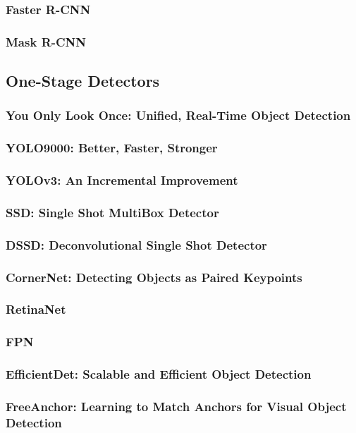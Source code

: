 \documentclass{article}
\begin{document}
\subsubsection{Faster R-CNN}
\subsubsection{Mask R-CNN}

\subsection{One-Stage Detectors}
\subsubsection{You Only Look Once: Unified, Real-Time Object Detection}
\subsubsection{YOLO9000: Better, Faster, Stronger}
\subsubsection{YOLOv3: An Incremental Improvement}
\subsubsection{SSD: Single Shot MultiBox Detector}
\subsubsection{DSSD: Deconvolutional Single Shot Detector}
\subsubsection{CornerNet: Detecting Objects as Paired Keypoints}
\subsubsection{RetinaNet}
\subsubsection{FPN}
\subsubsection{EfficientDet: Scalable and Efficient Object Detection}
\subsubsection{FreeAnchor: Learning to Match Anchors for Visual Object Detection}
\end{document}
